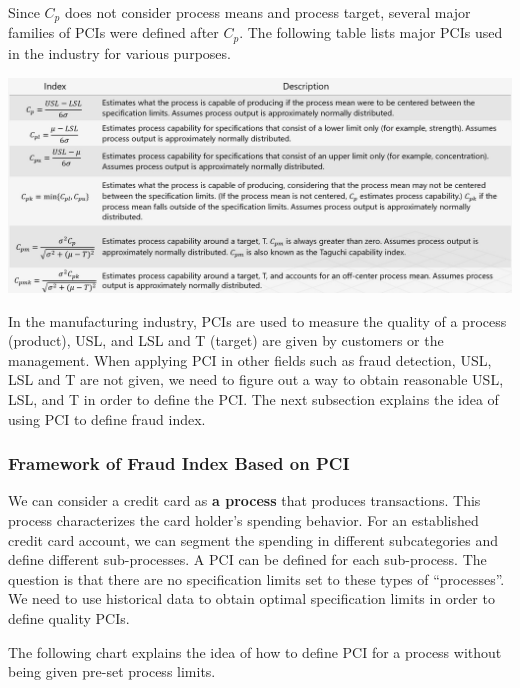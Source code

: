 \documentclass[
]{article}
\begin{document}
Since \(C_p\) does not consider process means and process target,
several major families of PCIs were defined after \(C_p\). The following
table lists major PCIs used in the industry for various purposes.

\begin{center}\includegraphics[width=22.68in]{img/w10-list-of-PCIs} \end{center}

In the manufacturing industry, PCIs are used to measure the quality of a
process (product), USL, and LSL and T (target) are given by customers or
the management. When applying PCI in other fields such as fraud
detection, USL, LSL and T are not given, we need to figure out a way to
obtain reasonable USL, LSL, and T in order to define the PCI. The next
subsection explains the idea of using PCI to define fraud index.

\hypertarget{framework-of-fraud-index-based-on-pci}{%
\subsubsection{Framework of Fraud Index Based on
PCI}\label{framework-of-fraud-index-based-on-pci}}

We can consider a credit card as \textbf{a process} that produces
transactions. This process characterizes the card holder's spending
behavior. For an established credit card account, we can segment the
spending in different subcategories and define different sub-processes.
A PCI can be defined for each sub-process. The question is that there
are no specification limits set to these types of ``processes''. We need
to use historical data to obtain optimal specification limits in order
to define quality PCIs.

The following chart explains the idea of how to define PCI for a process
without being given pre-set process limits.
\end{document}
